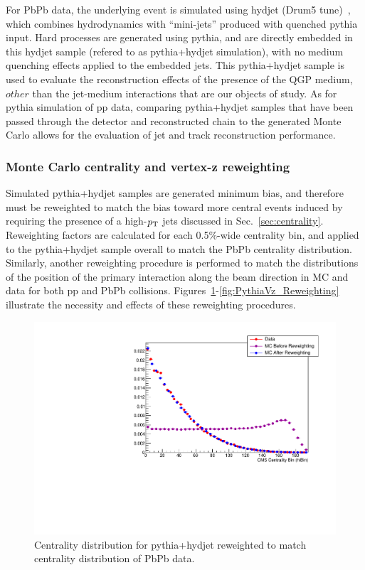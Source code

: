 For PbPb data, the underlying event is simulated using {\sc hydjet} (Drum5 tune)~\cite{Lokhtin:2005px}, which combines hydrodynamics with ``mini-jets''  produced with quenched pythia input.  Hard processes are generated using {\sc pythia}, and are directly embedded in this {\sc hydjet} sample (refered to as {\sc pythia+hydjet} simulation), with no medium quenching effects applied to the embedded jets.  This {\sc pythia+hydjet} sample is used to evaluate the reconstruction effects of the presence of the QGP medium, $other$ than the jet-medium interactions that are our objects of study.  As for {\sc pythia} simulation of pp data, comparing {\sc pythia+hydjet} samples that have been passed through the detector and reconstructed chain to the generated Monte Carlo allows for the evaluation of jet and track reconstruction performance.  


\subsubsection{Monte Carlo centrality and vertex-z reweighting}

Simulated {\sc pythia+hydjet} samples are generated minimum bias, and therefore must be reweighted to match the bias toward more central events induced by requiring the presence of a high-$p_{\rm T}$ jets discussed in Sec.~\ref{sec:centrality}.  Reweighting factors are calculated for each 0.5\%-wide centrality bin, and applied to the {\sc pythia+hydjet} sample overall to match the PbPb centrality distribution.  Similarly, another reweighting procedure is performed to match the distributions of the position of the primary interaction along the beam direction in MC and data for both pp and PbPb collisions.  Figures~\ref{fig:HydCent_Reweighting}-\ref{fig:PythiaVz_Reweighting} illustrate the necessity and effects of these reweighting procedures.  


\begin{figure}[ht]
\begin {center}
  \includegraphics[width=0.58\linewidth]{figures/Samples/HydjetCentralityReweighting.pdf}
  \caption{
    Centrality distribution for {\sc pythia+hydjet} reweighted to match centrality distribution of PbPb data.
  }
\label{fig:HydCent_Reweighting}
\end{center}
\end{figure}



